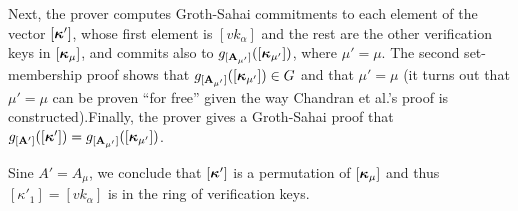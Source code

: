 Next, the prover computes Groth-Sahai commitments to each element of the vector $[{\boldsymbol{\kappa}}']$, whose first element is $[vk_\alpha]$ and the rest are the other verification keys in $[{\boldsymbol{\kappa}}_\mu]$, and commits also to $g_{[\mathbf{{A_{\mu'}}}]}([{\boldsymbol{\kappa}}_{\mu'}])$, where $\mu'=\mu$. The second set-membership proof shows that $g_{[\mathbf{{A_{\mu'}}}]}([{\boldsymbol{\kappa}}_{\mu'}])\in G$ and that $\mu'=\mu$ (it turns out that $\mu'=\mu$ can be proven ``for free'' given the way Chandran et al.'s proof is constructed).Finally, the prover gives a Groth-Sahai proof that $g_{[\mathbf{{A}}']}([{\boldsymbol{\kappa}}'])=g_{[\mathbf{{A_{\mu'}}}]}([{\boldsymbol{\kappa}}_{\mu'}])$.

Sine $A'=A_\mu$, we conclude that $[{\boldsymbol{\kappa}}']$ is a permutation of $[{\boldsymbol{\kappa}}_\mu]$ and thus $[\kappa'_1]=[vk_\alpha]$ is in the ring of verification keys.


